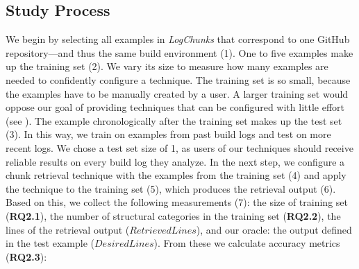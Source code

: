 \subsection{Study Process}
We begin by selecting all examples in \emph{LogChunks}
that correspond to one GitHub repository---and thus the
same build environment (1).
One to five examples make up the training set (2).
We vary its size to measure how many examples are needed to
confidently configure a technique.
The training set is so small, because the examples have to be
manually created by a user.
A larger training set would oppose our goal of providing techniques
that can be configured with little effort
(see ).
The example chronologically after the training set makes up the
test set (3).
In this way, we train on examples from past build logs and test on
more recent logs.
We chose a test set size of 1, as users of our techniques
should receive reliable results on every build log they analyze.
In the next step, we configure a chunk retrieval technique with
the examples from the training set (4) and apply the technique to the
training set (5), which produces the retrieval output (6).
Based on this, we collect the following measurements (7):
the size of training set (\textbf{RQ2.1}),
the number of structural categories in the training
set (\textbf{RQ2.2}),
the lines of the retrieval output ($\mathit{RetrievedLines}$),
and our oracle: the output defined in the test example
($\mathit{DesiredLines}$).
From these we calculate accuracy metrics (\textbf{RQ2.3}):

